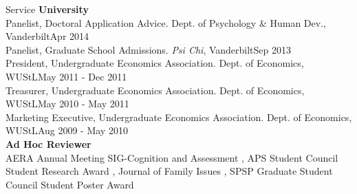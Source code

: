 \documentclass {resume}
\begin{document}
\begin{rSection}{\textrm{Service}}
{\large \textbf{University}}\\
Panelist, Doctoral Application Advice. Dept. of Psychology \& Human Dev., Vanderbilt\hfill {Apr 2014}\smallskip\\
Panelist, Graduate School Admissions. \textit{Psi Chi}, Vanderbilt\hfill {Sep 2013}\smallskip\\
President, Undergraduate Economics Association. Dept. of Economics, WUStL\hfill  {May 2011 - Dec 2011}\smallskip\\
Treasurer, Undergraduate Economics Association. Dept. of Economics, WUStL\hfill  {May 2010 - May 2011}\smallskip\\
Marketing Executive, Undergraduate Economics Association. Dept. of Economics, WUStL\hfill  {Aug 2009 - May 2010}\medskip\\
{\large \textbf{Ad Hoc Reviewer}}\\
AERA Annual Meeting SIG-Cognition and Assessment%
, APS Student Council Student Research Award%
, Journal of Family Issues%
, SPSP Graduate Student Council Student Poster Award%
\end{rSection}
\end{document}

